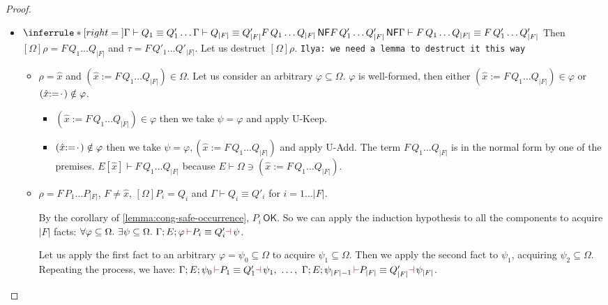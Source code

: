 \documentclass[a4,natbib=false]{article}
\newcommand{\ilyam}[1]{{\color{red} \texttt{Ilya:  #1}}}
\newcommand{\ctxtapp}[2]{[{#1}] {#2}}
\newcommand{\evarassign}[2]{({#1} \mathsf{:=} {#2})}
\newcommand{\spcdot}{\mkern 2mu\cdot\mkern 2mu}
\newcommand{\narg}[1]{|{#1}|}
\newcommand{\judgectx}[2]{{#1} \vdash {#2}}
\newcommand{\judgeequivuntg}[3]{{#1} \vdash {#2} \equiv {#3}}
\newcommand{\judgeunify}[4]{{#1}\,{\color{purple}\vdash} {#2} \equiv {#3} {\color{purple}\dashv}\,{#4}}
\newcommand{\judgeSnf}[1]{{#1}\,\mathsf{NF}}
\newcommand{\judgeSokterm}[1]{{#1} \,\mathsf{OK}}
\newcommand{\fullterm}[2]{{#1}\,#2_1 \dots #2_{\narg{#1}}}
\newcommand{\Infer}[3]{\inferrule*[right={#1}]{#2}{#3}}
\begin{document}
\begin{proof}
\begin{itemize}
  \item
    $
    \Infer{}
    {
      \judgeequivuntg{\Gamma}{Q_1}{Q'_1} \\
      \dots\\
      \judgeequivuntg{\Gamma}{Q_{\narg{F}}}{Q'_{\narg{F}}} \\
      \judgeSnf{\fullterm{F}{Q}} \\
      \judgeSnf{\fullterm{F}{Q'}}
    }
    {
      \judgeequivuntg{\Gamma}{\fullterm{F}{Q}}{\fullterm{F}{Q'}}
    }
    $
    Then $\ctxtapp{\Omega}{\rho} = \fullterm{F}{Q}$ and $\tau =
    \fullterm{F}{Q'}$.
    Let us destruct $\ctxtapp{\Omega}{\rho}$. \ilyam{we need a lemma to destruct
    it this way}
    \begin{itemize}
      \item $\rho = \hat{x}$ and $\evarassign{\hat{x}}{\fullterm{F}{Q}} \in
        \Omega$. Let us consider an arbitrary $\varphi \subseteq \Omega$.
        $\varphi$ is well-formed, then either $\evarassign{\hat{x}}{\fullterm{F}{Q}} \in
        \varphi$ or $\evarassign{\hat{x}}{\spcdot} \notin \varphi$.
        \begin{itemize}
        \item $\evarassign{\hat{x}}{\fullterm{F}{Q}} \in \varphi$ then we
          take $\psi = \varphi$ and apply U-Keep. 
        \item $\evarassign{\hat{x}}{\spcdot} \notin \varphi$ then we
          take $\psi = \varphi, \evarassign{\hat{x}}{\fullterm{F}{Q}}$
          and apply U-Add. The term $\fullterm{F}{Q}$
          is in the normal form by one
          of the premises. $\judgectx{E[\hat{x}]}{\fullterm{F}{Q}}$ because
          $\judgectx{E}{\Omega} \ni \evarassign{\hat{x}}{\fullterm{F}{Q}}$.

        \end{itemize}
      \item $\rho = \fullterm{F}{P}$, $F \neq \hat{x}$, 
        $\ctxtapp{\Omega}{P_i} = Q_i$ and $\judgeequivuntg{\Gamma}{Q_i}{Q'_i}$ for $i = 1\dots\narg{F}$.

        By the corollary of \cref{lemma:cong-safe-occurrence},
        $\judgeSokterm{P_i}$. So we can apply the induction hypothesis to all
        the components to acquire $\narg{F}$ facts: $\forall \varphi \subseteq \Omega.
        ~ \exists \psi \subseteq \Omega. ~ \judgeunify{\Gamma; E; \varphi}{P_i}{Q'_i}{\psi}$.

        Let us apply the first fact to an arbitrary $\varphi = \psi_0 \subseteq
        \Omega$ to acquire $\psi_1 \subseteq \Omega$. Then we apply the second
        fact to $\psi_1 $, acquiring $\psi_2 \subseteq \Omega$. Repeating the process, we have:
        $\judgeunify{\Gamma; E; \psi_0}{P_1}{Q'_1}{\psi_1}, ~ \dots, ~
        \judgeunify{\Gamma; E; \psi_{\narg{F}-1}}{P_{\narg{F}}}{Q'_{\narg{F}}}{\psi_{\narg{F}}}$.


\end{itemize}
\end{itemize}
\end{proof}
\end{document}
